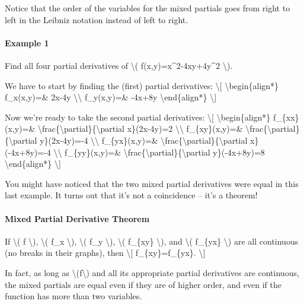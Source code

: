 Notice that the order of the variables for the mixed partials goes from
right to left in the Leibniz notation instead of left to right.

\hypertarget{example-1}{%
\paragraph{Example 1}\label{example-1}}

Find all four partial derivatives of \textbackslash{}(
f(x,y)=x\^{}2-4xy+4y\^{}2 \textbackslash{}).

We have to start by finding the (first) partial derivatives:
\textbackslash{}{[} \textbackslash{}begin\{align*\} f\_x(x,y)=\& 2x-4y
\textbackslash{}\textbackslash{} f\_y(x,y)=\& -4x+8y
\textbackslash{}end\{align*\} \textbackslash{}{]}

Now we're ready to take the second partial derivatives:
\textbackslash{}{[} \textbackslash{}begin\{align*\} f\_\{xx\}(x,y)=\&
\textbackslash{}frac\{\textbackslash{}partial\}\{\textbackslash{}partial
x\}(2x-4y)=2 \textbackslash{}\textbackslash{} f\_\{xy\}(x,y)=\&
\textbackslash{}frac\{\textbackslash{}partial\}\{\textbackslash{}partial
y\}(2x-4y)=-4 \textbackslash{}\textbackslash{} f\_\{yx\}(x,y)=\&
\textbackslash{}frac\{\textbackslash{}partial\}\{\textbackslash{}partial
x\}(-4x+8y)=-4 \textbackslash{}\textbackslash{} f\_\{yy\}(x,y)=\&
\textbackslash{}frac\{\textbackslash{}partial\}\{\textbackslash{}partial
y\}(-4x+8y)=8 \textbackslash{}end\{align*\} \textbackslash{}{]}

You might have noticed that the two mixed partial derivatives were equal
in this last example. It turns out that it's not a coincidence -- it's a
theorem!

\hypertarget{mixed-partial-derivative-theorem}{%
\paragraph{Mixed Partial Derivative
Theorem}\label{mixed-partial-derivative-theorem}}

If \textbackslash{}( f \textbackslash{}), \textbackslash{}( f\_x
\textbackslash{}), \textbackslash{}( f\_y \textbackslash{}),
\textbackslash{}( f\_\{xy\} \textbackslash{}), and \textbackslash{}(
f\_\{yx\} \textbackslash{}) are all continuous (no breaks in their
graphs), then \textbackslash{}{[} f\_\{xy\}=f\_\{yx\}.
\textbackslash{}{]}

In fact, as long as \textbackslash{}(f\textbackslash{}) and all its
appropriate partial derivatives are continuous, the mixed partials are
equal even if they are of higher order, and even if the function has
more than two variables.

